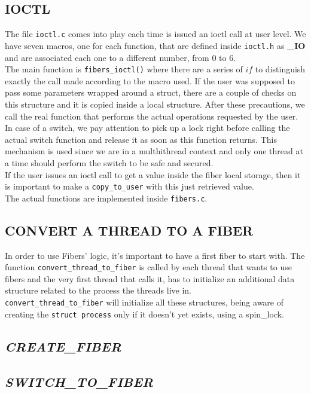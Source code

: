 \documentclass[a4paper]{article}
\begin{document}
\subsection*{IOCTL}
The file \texttt{ioctl.c} comes into play each time is issued an ioctl call at user level. We have seven macros, one for each function, that are defined inside \texttt{ioctl.h} as \textbf{\_IO} and are associated each one to a different number, from 0 to 6.\bigskip\\
The main function is \texttt{fibers\_ioctl()} where there are a series of $if$ to distinguish exactly the call made according to the macro used. If the user was supposed to pass some parameters wrapped around a struct, there are a couple of checks on this structure and it is copied inside a local structure. After these precautions, we call the real function that performs the actual operations requested by the user.\bigskip\\
In case of a switch, we pay attention to pick up a lock right before calling the actual switch function and release it as soon as this function returns. This mechanism is used since we are in a multhithread context and only one thread at a time should perform the switch to be safe and secured.\bigskip\\
If the user issues an ioctl call to get a value inside the fiber local storage, then it is important to make a \texttt{copy\_to\_user} with this just retrieved value.\bigskip\\
The actual functions are implemented inside \texttt{fibers.c}.

\subsection*{CONVERT A THREAD TO A FIBER}
In order to use Fibers' logic, it's important to have a first fiber to start with. The function \texttt{convert\_thread\_to\_fiber} is called by each thread that wants to use fibers and the very first thread that calls it, has to initialize an additional data structure related to the process the threads live in.\bigskip\\
\texttt{convert\_thread\_to\_fiber} will initialize all these structures, being aware of creating the \texttt{struct process} only if it doesn't yet exists, using a spin\_lock. 
\subsection*{\textit{CREATE\_FIBER}}
\subsection*{\textit{SWITCH\_TO\_FIBER}}
\end{document}
